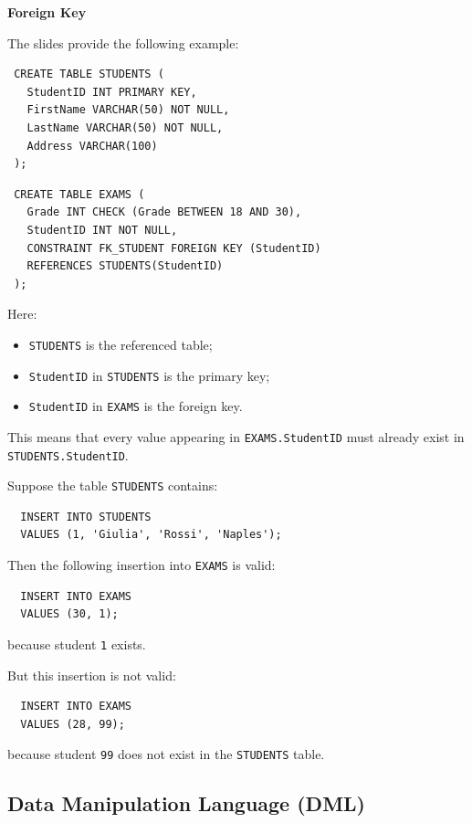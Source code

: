  \begin{example}{\textbf{Foreign Key}}

 The slides provide the following example:

 \begin{verbatim}
 CREATE TABLE STUDENTS (
   StudentID INT PRIMARY KEY,
   FirstName VARCHAR(50) NOT NULL,
   LastName VARCHAR(50) NOT NULL,
   Address VARCHAR(100)
 );
 \end{verbatim}

 \begin{verbatim}
 CREATE TABLE EXAMS (
   Grade INT CHECK (Grade BETWEEN 18 AND 30),
   StudentID INT NOT NULL,
   CONSTRAINT FK_STUDENT FOREIGN KEY (StudentID)
   REFERENCES STUDENTS(StudentID)
 );
 \end{verbatim}

 Here:
 \begin{itemize}
  \item \texttt{STUDENTS} is the referenced table;
  \item \texttt{StudentID} in \texttt{STUDENTS} is the primary key;
  \item \texttt{StudentID} in \texttt{EXAMS} is the foreign key.
 \end{itemize}

 This means that every value appearing in \texttt{EXAMS.StudentID} must already exist in \texttt{STUDENTS.StudentID}.

\vs
  Suppose the table \texttt{STUDENTS} contains:
  \begin{verbatim}
  INSERT INTO STUDENTS
  VALUES (1, 'Giulia', 'Rossi', 'Naples');
  \end{verbatim}

  Then the following insertion into \texttt{EXAMS} is valid:
  \begin{verbatim}
  INSERT INTO EXAMS
  VALUES (30, 1);
  \end{verbatim}

  because student \texttt{1} exists.

  But this insertion is not valid:
  \begin{verbatim}
  INSERT INTO EXAMS
  VALUES (28, 99);
  \end{verbatim}

  because student \texttt{99} does not exist in the \texttt{STUDENTS} table.

 \end{example}

\subsection{Data Manipulation Language (DML)}

